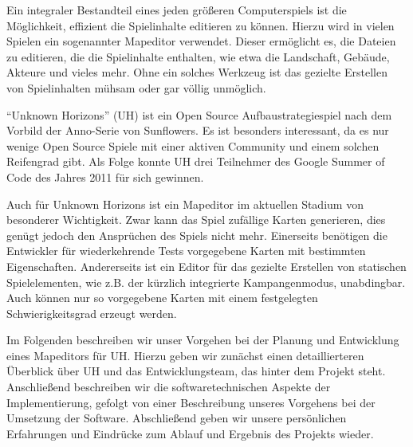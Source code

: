 Ein integraler Bestandteil eines jeden größeren Computerspiels ist die
Möglichkeit, effizient die Spielinhalte editieren zu können. Hierzu wird in vielen Spielen ein sogenannter Mapeditor verwendet.
Dieser ermöglicht es, die Dateien zu editieren, die die Spielinhalte enthalten, wie etwa
die Landschaft, Gebäude, Akteure und vieles mehr.
Ohne ein solches Werkzeug ist das gezielte Erstellen von Spielinhalten mühsam
oder gar völlig unmöglich.

\enquote{Unknown Horizons} (UH) \cite{uh} ist ein Open Source
Aufbaustrategiespiel nach dem Vorbild der Anno-Serie von Sunflowers.
Es ist
besonders interessant, da es nur wenige Open Source Spiele mit einer aktiven
Community und einem solchen Reifengrad gibt. Als Folge konnte UH drei Teilnehmer des
Google Summer of Code des Jahres 2011 für sich gewinnen.

Auch für Unknown Horizons ist ein Mapeditor im aktuellen Stadium von besonderer
Wichtigkeit.
Zwar kann das Spiel zufällige Karten generieren, dies genügt jedoch den
Ansprüchen des Spiels nicht mehr. Einerseits benötigen die Entwickler für
wiederkehrende Tests vorgegebene Karten mit bestimmten Eigenschaften.
Andererseits ist ein Editor für das gezielte Erstellen von statischen
Spielelementen, wie z.B. der kürzlich integrierte
Kampangenmodus, unabdingbar. Auch können nur so vorgegebene Karten mit einem
festgelegten Schwierigkeitsgrad erzeugt werden.

Im Folgenden beschreiben wir unser Vorgehen bei der Planung und Entwicklung
eines Mapeditors für UH. Hierzu geben wir zunächst einen detaillierteren
Überblick über UH und das Entwicklungsteam, das hinter dem Projekt steht.
Anschließend beschreiben wir die softwaretechnischen Aspekte der Implementierung, gefolgt
von einer Beschreibung unseres Vorgehens bei der Umsetzung der Software. Abschließend
geben wir unsere persönlichen Erfahrungen und Eindrücke zum Ablauf und Ergebnis des Projekts
wieder.


